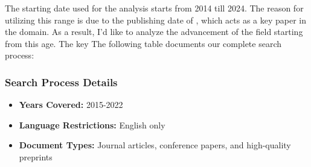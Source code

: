 The starting date used for the analysis starts from 2014 till 2024. The reason for utilizing this range
is due to the publishing date of \cite{SierraCanto2010ParallelTO}, which acts as a key paper in the domain. As a result,
I'd like to analyze the advancement of the field starting from this age. The key The following table 
documents our complete search process:



\subsubsection{Search Process Details}
\begin{itemize}
    \item \textbf{Years Covered:} 2015-2022
    \item \textbf{Language Restrictions:} English only
    \item \textbf{Document Types:} Journal articles, conference papers, and high-quality preprints
\end{itemize}

